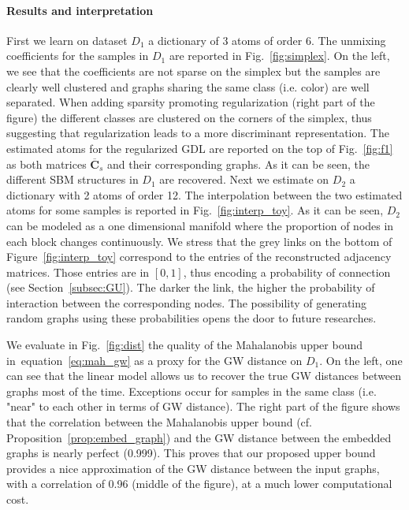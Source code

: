 \documentclass{article}
\def\eqref#1{equation~\ref{#1}}
\def\mC{{\bm{C}}}
\begin{document}
	\paragraph{Results and interpretation} First we learn on dataset $D_1$ a dictionary
	of 3 atoms of order 6. The unmixing coefficients for the
	samples in $D_1$ are reported in Fig.~\ref{fig:simplex}. On the left, we see that the coefficients are not sparse on the simplex but the samples are clearly
	well clustered and graphs sharing the same class (i.e. color) are well separated.  
	When adding sparsity promoting regularization  (right part of the figure) the
	different classes are clustered on the corners of the simplex, thus suggesting
	that regularization leads to a more discriminant representation. The estimated atoms
	for the regularized GDL are reported on the top of Fig.~\ref{fig:f1} as both
	matrices $\overline{\mC}_s$ and their corresponding graphs.
	As it can be seen, the different SBM structures in $D_1$ are recovered.
	Next we estimate on $D_2$ a dictionary with 2 atoms of order 12. 
	The interpolation between the two estimated atoms for some samples is reported in Fig.~\ref{fig:interp_toy}.
	As it can be seen, $D_2$ can be modeled as a one dimensional manifold where the
	proportion of nodes in each block changes continuously. We stress that the grey links on the bottom of Figure~\ref{fig:interp_toy} correspond to the entries of the reconstructed adjacency matrices. Those entries are in $[0,1]$, thus encoding a probability of connection (see Section~\ref{subsec:GU}). 
	The darker the link, the higher the probability of interaction between the corresponding nodes. The possibility of generating random graphs using
	these probabilities opens the door to future researches.
	
	We evaluate in Fig.~\ref{fig:dist} the
	quality of the Mahalanobis upper bound in~\eqref{eq:mah_gw} as a proxy for the GW distance on
	$D_1$. 
	On the left, one can see that the linear model allows us to recover the true GW distances between graphs most of the time.
	Exceptions occur for samples in the same class (i.e.  "near" to each other in terms of GW distance).
	The right part of the figure shows that the
	correlation between the Mahalanobis upper bound (cf. Proposition~\ref{prop:embed_graph}) and the GW distance between the
	embedded graphs is nearly perfect (0.999). This proves that our proposed upper bound
	provides a nice approximation of the GW distance between the input graphs, with a correlation of 0.96 (middle of the figure), at a much lower computational cost.  
	
\end{document}
